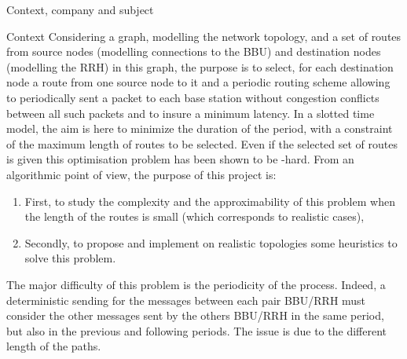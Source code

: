 \documentclass[a4paper,10pt]{report}
\begin{document}
\begin{chapter}{Context, company and subject}
\begin{section}{Context}
Considering a graph, modelling the network topology, and a set of routes from source nodes (modelling connections to the BBU) and destination 
nodes (modelling the RRH) in this graph, the purpose is to select, for each destination node a route from one source node to it and a periodic 
routing scheme allowing to periodically sent a packet to each base station without congestion conflicts between all such packets and to insure a minimum latency. In a slotted time model, the aim is here to minimize the duration of the period, with a constraint of the maximum length of routes to be
selected. Even if the selected set of routes is given this optimisation problem has been shown to be  \NP-hard. From an algorithmic point of view,
the purpose of this project is:
\begin{enumerate}
 \item First, to study the complexity and the approximability of this problem when the length of the routes is small
(which corresponds to realistic cases),
\item Secondly, to propose and implement on realistic topologies some 
heuristics to solve this problem.
\end{enumerate}

The major difficulty of this problem is the periodicity of the process. Indeed, a deterministic sending for the messages
between each pair BBU/RRH must consider the other messages sent by the others BBU/RRH in the same period, but also in the previous
and following periods. The issue is due to the different length of the paths.
\end{section}

\end{chapter}
\end{document}
